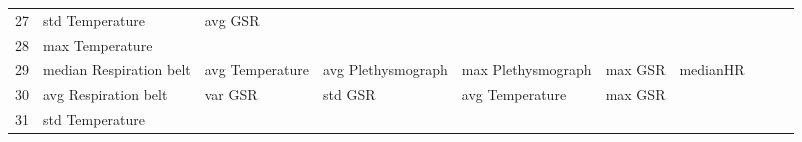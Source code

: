\begin{landscape}
\begin{table}[]
\begin{tabular}{l|llllllll}
27       & std Temperature         & avg GSR               &                         &                         &                         &                       &                      &          &                      &        \\
28       & max Temperature         &                       &                         &                         &                         &                       &                      &          &                      &        \\
29       & median Respiration belt & avg Temperature       & avg Plethysmograph      & max Plethysmograph      & max GSR                 & medianHR              &                      &          &                      &        \\
30       & avg Respiration belt    & var GSR               & std GSR                 & avg Temperature         & max GSR                 &                       &                      &          &                      &        \\
31       & std Temperature         &                       &                         &                         &                         &                       &                      &          &                      &        \\
\end{tabular}
\end{table}
\end{landscape}
\clearpage
